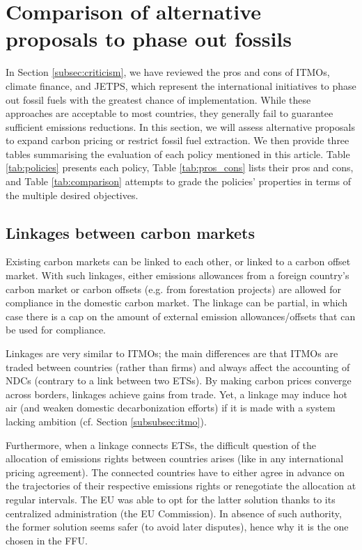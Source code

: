 \documentclass[12pt,english]{article}
\begin{document}
\section{Comparison of alternative proposals to phase out fossils} %

In Section \ref{subsec:criticism}, we have reviewed the pros and cons of ITMOs, climate finance, and JETPS, which represent the international initiatives to phase out fossil fuels with the greatest chance of implementation. While these approaches are acceptable to most countries, they generally fail to guarantee sufficient emissions reductions. In this section, we will assess alternative proposals to expand carbon pricing or restrict fossil fuel extraction. We then provide three tables summarising the evaluation of each policy mentioned in this article.  Table \ref{tab:policies} presents each policy, Table \ref{tab:pros_cons} lists their pros and cons, and Table \ref{tab:comparison} attempts to grade the policies' properties in terms of the multiple desired objectives. 

\subsection{Linkages between carbon markets}

Existing carbon markets can be linked to each other, or linked to a carbon offset market.\citep{jaffe_linking_2010} With such linkages, either emissions allowances from a foreign country's carbon market or carbon offsets (e.g. from forestation projects) are allowed for compliance in the domestic carbon market. The linkage can be partial, in which case there is a cap on the amount of external emission allowances/offsets that can be used for compliance. 

Linkages are very similar to ITMOs; the main differences are that ITMOs are traded between countries (rather than firms) and always affect the accounting of NDCs (contrary to a link between two ETSs). By making carbon prices converge across borders, linkages achieve gains from trade. Yet, a linkage may induce hot air (and weaken domestic decarbonization efforts) if it is made with a system lacking ambition (cf. Section \ref{subsubsec:itmo}). 

Furthermore, when a linkage connects ETSs, the difficult question of the allocation of emissions rights between countries arises (like in any international pricing agreement). The connected countries have to either agree in advance on the trajectories of their respective emissions rights or renegotiate the allocation at regular intervals. The EU was able to opt for the latter solution thanks to its centralized administration (the EU Commission). In absence of such authority, the former solution seems safer (to avoid later disputes), hence why it is the one chosen in the FFU.
\end{document}
